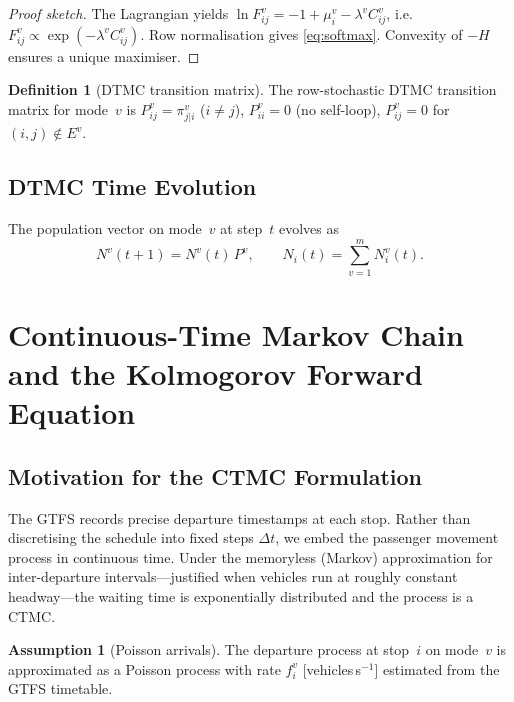 \documentclass[12pt,a4paper]{article}
\theoremstyle{plain}
\theoremstyle{definition}
\newtheorem{definition}[theorem]{Definition}
\newtheorem{assumption}[theorem]{Assumption}
\theoremstyle{remark}
\begin{document}
\begin{proof}[Proof sketch]
The Lagrangian yields $\ln F^v_{ij}=-1+\mu^v_i-\lambda^v C^v_{ij}$, i.e.\
$F^v_{ij}\propto\exp(-\lambda^v C^v_{ij})$.  Row normalisation gives
\eqref{eq:softmax}.  Convexity of $-H$ ensures a unique maximiser.
\end{proof}

\begin{definition}[DTMC transition matrix]
\label{def:dtmc}
The row-stochastic DTMC transition matrix for mode~$v$ is
$P^v_{ij}=\pi^v_{j|i}$ ($i\ne j$), $P^v_{ii}=0$ (no self-loop),
$P^v_{ij}=0$ for $(i,j)\notin E^v$.
\end{definition}

\subsection{DTMC Time Evolution}

The population vector on mode~$v$ at step~$t$ evolves as
\begin{equation}
  N^v(t+1) = N^v(t)\,P^v,\qquad N_i(t)=\sum_{v=1}^m N^v_i(t).
\end{equation}

\section{Continuous-Time Markov Chain and the Kolmogorov Forward Equation}
\label{sec:ctmc}

\subsection{Motivation for the CTMC Formulation}

The GTFS records precise departure timestamps at each stop.  Rather than
discretising the schedule into fixed steps $\Delta t$, we embed the passenger
movement process in continuous time.  Under the memoryless (Markov)
approximation for inter-departure intervals---justified when vehicles run at
roughly constant headway---the waiting time is exponentially distributed and the
process is a CTMC.

\begin{assumption}[Poisson arrivals]
\label{ass:poisson}
The departure process at stop~$i$ on mode~$v$ is approximated as a Poisson
process with rate $f^v_i$ [vehicles\,s$^{-1}$] estimated from the GTFS
timetable.
\end{assumption}
\end{document}
